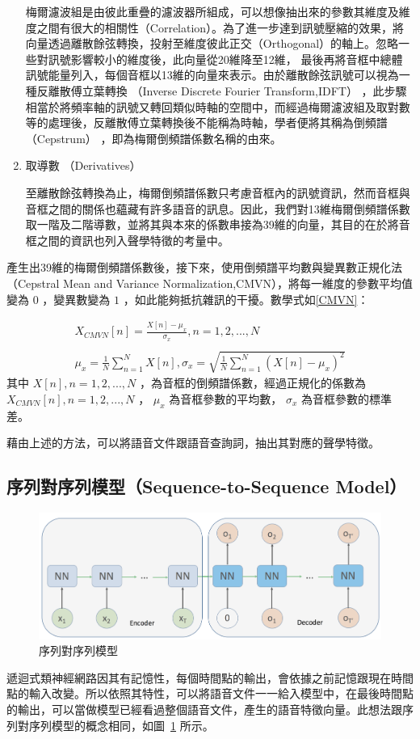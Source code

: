 \begin{enumerate}
		梅爾濾波組是由彼此重疊的濾波器所組成，可以想像抽出來的參數其維度及維度之間有很大的相關性（Correlation）。為了進一步達到訊號壓縮的效果，將向量透過離散餘弦轉換，投射至維度彼此正交（Orthogonal）的軸上。忽略一些對訊號影響較小的維度後，此向量從20維降至12維，
		最後再將音框中總體訊號能量列入，每個音框以13維的向量來表示。由於離散餘弦訊號可以視為一種反離散傅立葉轉換
		（Inverse Discrete Fourier Transform,IDFT）
		，此步驟相當於將頻率軸的訊號又轉回類似時軸的空間中，而經過梅爾濾波組及取對數等的處理後，反離散傅立葉轉換後不能稱為時軸，學者便將其稱為倒頻譜
		（Cepstrum） ，即為梅爾倒頻譜係數名稱的由來。
	\item 取導數 （Derivatives）
		
		至離散餘弦轉換為止，梅爾倒頻譜係數只考慮音框內的訊號資訊，然而音框與音框之間的關係也蘊藏有許多語音的訊息。因此，我們對13維梅爾倒頻譜係數取一階及二階導數，並將其與本來的係數串接為39維的向量，其目的在於將音框之間的資訊也列入聲學特徵的考量中。
\end{enumerate}

產生出39維的梅爾倒頻譜係數後，接下來，使用倒頻譜平均數與變異數正規化法（Cepstral
Mean and Variance
Normalization,CMVN），將每一維度的參數平均值變為 $ 0 $ ，變異數變為 $ 1 $ ，如此能夠抵抗雜訊的干擾。數學式如\ref{CMVN}：

\begin{equation}
\begin{aligned}
X_{CMVN}[n] = \frac{ X[n] - \mu_x }{ \sigma_x } ,n = 1,2,...,N
\\
\\
\mu_{x} = \frac{1}{N} \sum_{n=1}^N {X[n]}, \sigma_x = \sqrt{\frac{1}{N}\sum_{n=1}^N{ (X[n] -\mu_{x} )^2}}
\end{aligned}
\label{CMVN}
\end{equation}
其中 $ X[n],n= 1, 2, ...,N $ ，為音框的倒頻譜係數，經過正規化的係數為 $ X_{CMVN}[n],n =
1,2,...,N $ ， $ \mu_x $  為音框參數的平均數， $ \sigma_x $  為音框參數的標準差。

藉由上述的方法，可以將語音文件跟語音查詢詞，抽出其對應的聲學特徵。
\subsection{序列對序列模型（Sequence-to-Sequence Model）\cite{sutskever2014sequence}}
\begin{figure}[h]
\centering
\includegraphics[scale=0.5]{images/ch3_seq2seq.png} 
\caption{序列對序列模型}
\label{ch3_seq2seq}
\end{figure}
\label{seq2seq}
遞迴式類神經網路因其有記憶性，每個時間點的輸出，會依據之前記憶跟現在時間點的輸入改變。所以依照其特性，可以將語音文件一一給入模型中，在最後時間點的輸出，可以當做模型已經看過整個語音文件，產生的語音特徵向量。此想法跟序列對序列模型的概念相同，如圖~\ref{ch3_seq2seq}
所示。

